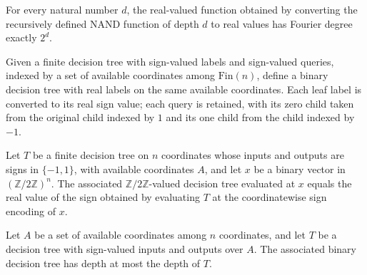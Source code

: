 \begin{theorem}
\label{FABL.fourierDegree_recursiveNAND}
\leanok
{}
For every natural number $d$, the real-valued function obtained by converting the
recursively defined NAND function of depth $d$ to real values has Fourier degree exactly
$2^d$.
\end{theorem}

\begin{definition}
\leanok
{}
Given a finite decision tree with sign-valued labels and sign-valued queries, indexed by
a set of available coordinates among $\mathrm{Fin}(n)$, define a binary decision tree
with real labels on the same available coordinates. Each leaf label is converted to its
real sign value; each query is retained, with its zero child taken from the original
child indexed by $1$ and its one child from the child indexed by $-1$.
\end{definition}

\begin{theorem}
\leanok
{}
Let $T$ be a finite decision tree on $n$ coordinates whose inputs and outputs are signs
in $\{ -1,1\}$, with available coordinates $A$, and let $x$ be a binary vector in
$(\mathbb{Z}/2\mathbb{Z})^n$. The associated $\mathbb{Z}/2\mathbb{Z}$-valued decision
tree evaluated at $x$ equals the real value of the sign obtained by evaluating $T$ at
the coordinatewise sign encoding of $x$.
\end{theorem}

\begin{theorem}
\leanok
{}
Let $A$ be a set of available coordinates among $n$ coordinates, and let $T$ be a
decision tree with sign-valued inputs and outputs over $A$. The associated binary
decision tree has depth at most the depth of $T$.
\end{theorem}

